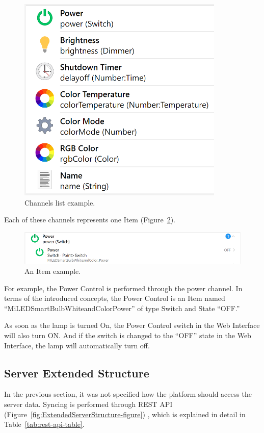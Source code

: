 \begin{figure}
  \centering
  \includegraphics[width=0.6\linewidth]{figures/XiaomiLampChannels.png}
  \caption{Channels list example.}
  \label{fig:XiaomiLampChannels-figure}
\end{figure}

Each of these channels represents one Item (Figure~\ref{fig:XiaomiLampPowerItem-figure}).

\begin{figure}
  \centering
  \includegraphics[width=0.9\linewidth]{figures/XiaomiLampPowerItem.png}
  \caption{An Item example.}
  \label{fig:XiaomiLampPowerItem-figure}
\end{figure}

For example, the Power Control is performed through the power channel. In terms of the introduced concepts, the Power Control is an Item named ``MiLEDSmartBulbWhiteandColorPower'' of type Switch and State ``OFF.''

As soon as the lamp is turned On, the Power Control switch in the Web Interface will also turn ON. And if the switch is changed to the ``OFF'' state in the Web Interface, the lamp will automatically turn off.

\subsection{Server Extended Structure}

In the previous section, it was not specified how the platform should access the server data. Syncing is performed through REST API (Figure~\ref{fig:ExtendedServerStructure-figure}) , which is explained in detail in Table~\ref{tab:rest-api-table}.

